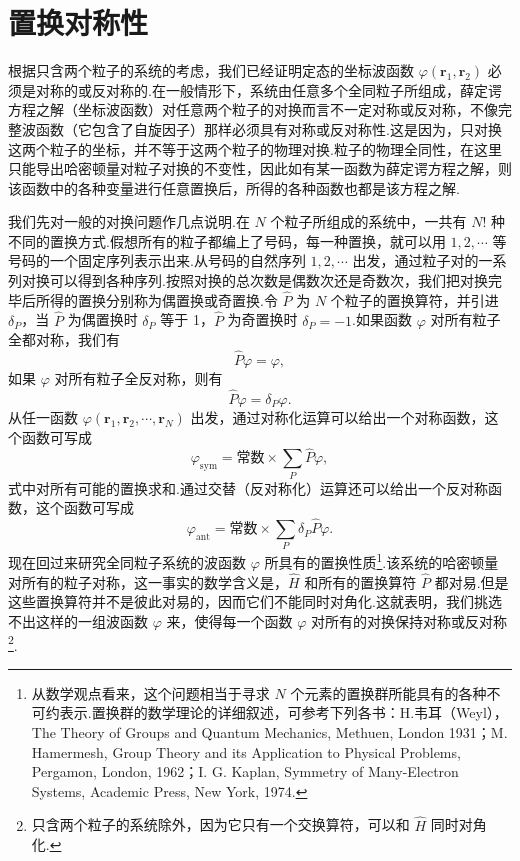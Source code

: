 \setcounter{equation}{0}%

\section{置换对称性}

根据只含两个粒子的系统的考虑，我们已经证明定态的坐标波函数 $\varphi(\boldsymbol{r}_1,\boldsymbol{r}_2)$ 必须是对称的或反对称的.在一般情形下，系统由任意多个全同粒子所组成，薛定谔方程之解（坐标波函数）对任意两个粒子的对换而言不一定对称或反对称，不像完整波函数（它包含了自旋因子）那样必须具有对称或反对称性.这是因为，只对换这两个粒子的坐标，并不等于这两个粒子的物理对换.粒子的物理全同性，在这里只能导出哈密顿量对粒子对换的不变性，因此如有某一函数为薛定谔方程之解，则该函数中的各种变量进行任意置换后，所得的各种函数也都是该方程之解.

我们先对一般的对换问题作几点说明.在 $N$ 个粒子所组成的系统中，一共有 $N!$ 种不同的置换方式.假想所有的粒子都编上了号码，每一种置换，就可以用 $1,2,\cdots$ 等号码的一个固定序列表示出来.从号码的自然序列 $1,2,\cdots$ 出发，通过粒子对的一系列对换可以得到各种序列.按照对换的总次数是偶数次还是奇数次，我们把对换完毕后所得的置换分别称为偶置换或奇置换.令 $\hat{P}$ 为 $N$ 个粒子的置换算符，并引进 $\delta_P$，当 $\hat{P}$ 为偶置换时 $\delta_P$ 等于 1，$\hat{P}$ 为奇置换时 $\delta_P=-1$.如果函数 $\varphi$ 对所有粒子全都对称，我们有
\begin{equation*}
  \hat{P}\varphi=\varphi,
\end{equation*}
如果 $\varphi$ 对所有粒子全反对称，则有
\begin{equation*}
  \hat{P}\varphi=\delta_P\varphi.
\end{equation*}
从任一函数 $\varphi(\boldsymbol{r}_1,\boldsymbol{r}_2,\cdots,\boldsymbol{r}_N)$ 出发，通过对称化运算可以给出一个对称函数，这个函数可写成
\begin{equation}
  \varphi_{\mathrm{sym}}=\text{常数}\times\sum_P\hat{P}\varphi,
\end{equation}
式中对所有可能的置换求和.通过交替（反对称化）运算还可以给出一个反对称函数，这个函数可写成
\begin{equation}
  \varphi_{\mathrm{ant}}=\text{常数}\times\sum_P\delta_P\hat{P}\varphi.
\end{equation}
现在回过来研究全同粒子系统的波函数 $\varphi$ 所具有的置换性质\footnote{从数学观点看来，这个问题相当于寻求 $N$ 个元素的置换群所能具有的各种不可约表示.置换群的数学理论的详细叙述，可参考下列各书：H.韦耳（Weyl），The Theory of Groups and Quantum Mechanics, Methuen, London 1931；M. Hamermesh, Group Theory and its Application to Physical Problems, Pergamon, London, 1962；I. G. Kaplan, Symmetry of Many-Electron Systems, Academic Press, New York, 1974.}.该系统的哈密顿量对所有的粒子对称，这一事实的数学含义是，$\hat{H}$ 和所有的置换算符 $\hat{P}$ 都对易.但是这些置换算符并不是彼此对易的，因而它们不能同时对角化.这就表明，我们挑选不出这样的一组波函数 $\varphi$ 来，使得每一个函数 $\varphi$ 对所有的对换保持对称或反对称\footnote{只含两个粒子的系统除外，因为它只有一个交换算符，可以和 $\hat{H}$ 同时对角化.}.

